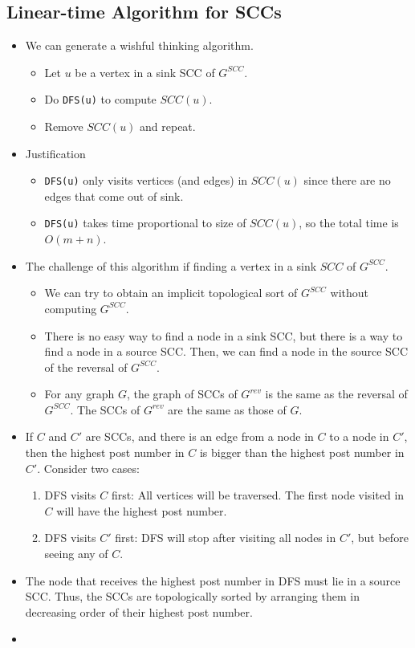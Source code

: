 \subsection{Linear-time Algorithm for SCCs}
\begin{itemize}
    \item We can generate a wishful thinking algorithm.
    \begin{itemize}
        \item Let $u$ be a vertex in a sink SCC of $G^{SCC}$.
        \item Do \texttt{DFS(u)} to compute $SCC(u)$.
        \item Remove $SCC(u)$ and repeat.
    \end{itemize}
    \item Justification
    \begin{itemize}
        \item \texttt{DFS(u)} only visits vertices (and edges) in $SCC(u)$ since there are no edges that come out of sink.
        \item \texttt{DFS(u)} takes time proportional to size of $SCC(u)$, so the total time is $O(m + n)$.
    \end{itemize}
    \item The challenge of this algorithm if finding a vertex in a sink $SCC$ of $G^{SCC}$.
    \begin{itemize}
        \item We can try to obtain an implicit topological sort of $G^{SCC}$ without computing $G^{SCC}$.
        \item There is no easy way to find a node in a sink SCC, but there is a way to find a node in a source SCC. Then, we can find a node in the source SCC of the reversal of $G^{SCC}$.
        \item For any graph $G$, the graph of SCCs of $G^{rev}$ is the same as the reversal of $G^{SCC}$. The SCCs of $G^{rev}$ are the same as those of $G$.
    \end{itemize}
    \item If $C$ and $C'$ are SCCs, and there is an edge from a node in $C$ to a node in $C'$, then the highest post number in $C$ is bigger than the highest post number in $C'$. Consider two cases:
    \begin{enumerate}
        \item DFS visits $C$ first: All vertices will be traversed. The first node visited in $C$ will have the highest post number.
        \item DFS visits $C'$ first: DFS will stop after visiting all nodes in $C'$, but before seeing any of $C$.
    \end{enumerate}
    \item The node that receives the highest post number in DFS must lie in a source SCC. Thus, the SCCs are topologically sorted by arranging them in decreasing order of their highest post number. 
    \item[] 
\end{itemize}

